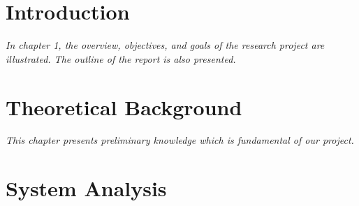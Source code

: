 \documentclass[12pt]{report}
\begin{document}

\setmainfont{Times New Roman}

\clearpage
{} 










% 



\listoftables
\newpage

\listoffigures
\newpage


\chapter{Introduction}

\textit{In chapter 1, the overview, objectives, and goals of the research project are illustrated. The outline of the report is also presented.}













\chapter{Theoretical Background}
\textit{This chapter presents preliminary knowledge which is fundamental of our project.}







\chapter{System Analysis}

\end{document}
